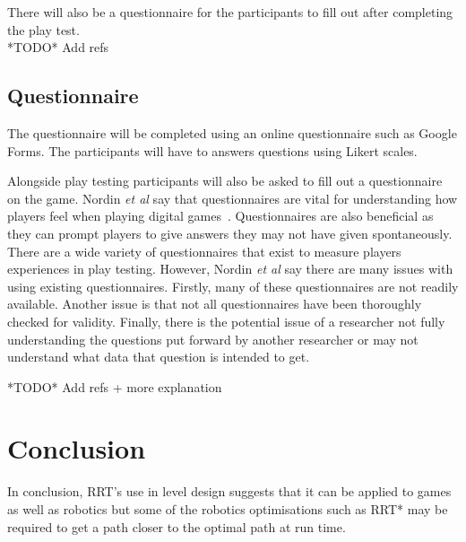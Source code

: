 \documentclass[journal]{IEEEtran}
\begin{document}
There will also be a questionnaire for the participants to fill out after completing the play test.\\

*TODO* Add refs

\subsection{Questionnaire}
The questionnaire will be completed using an online questionnaire such as Google Forms. The participants will have to answers questions using Likert scales.

Alongside play testing participants will also be asked to fill out a questionnaire on the game. Nordin \textit{et al} say that questionnaires are vital for understanding how players feel when playing digital games~\cite{nordin2014}. Questionnaires are also beneficial as they can prompt players to give answers they may not have given spontaneously. There are a wide variety of questionnaires that exist to measure players experiences in play testing. However, Nordin \textit{et al} say there are many issues with using existing questionnaires. Firstly, many of these questionnaires are not readily available. Another issue is that not all questionnaires have been thoroughly checked for validity. Finally, there is the potential issue of a researcher not fully understanding the questions put forward by another researcher or may not understand what data that question is intended to get.
  
  
 
  
*TODO* Add refs + more explanation


\section{Conclusion}
In conclusion, RRT's use in level design suggests that it can be applied to games as well as robotics but some of the robotics optimisations such as RRT* may be required to get a path closer to the optimal path at run time.







\end{document}
